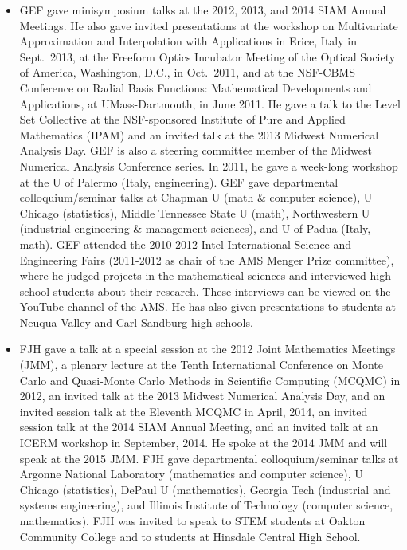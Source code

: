 \documentclass[11pt]{NSFamsart}
\begin{document}
\begin{itemize}[leftmargin=2.5ex]
\item GEF gave minisymposium talks at the 2012, 2013, and 2014 SIAM Annual Meetings.  He also gave invited presentations at the workshop on Multivariate Approximation and Interpolation with Applications in Erice, Italy in Sept.~2013, at the Freeform Optics Incubator Meeting of the Optical Society of America, Washington, D.C., in Oct.~2011, and at the NSF-CBMS Conference on Radial Basis Functions: Mathematical Developments and Applications, at UMass-Dartmouth, in June 2011. He gave a talk to the Level Set Collective at the NSF-sponsored Institute of Pure and Applied Mathematics (IPAM) and an invited talk at the 2013 Midwest Numerical Analysis Day. GEF is also a steering committee member of the Midwest Numerical Analysis Conference series. In 2011, he gave a week-long workshop at the U of Palermo (Italy, engineering). GEF gave departmental colloquium/seminar talks at Chapman U (math \& computer science), U Chicago (statistics), Middle Tennessee State U (math), Northwestern U (industrial engineering \& management sciences), and U of Padua (Italy, math).  GEF attended the 2010-2012 Intel International Science and Engineering Fairs (2011-2012 as chair of the AMS Menger Prize committee), where he judged projects in the mathematical sciences and interviewed high school students about their research. These interviews can be viewed on the YouTube channel of the AMS. He has also given presentations to students at Neuqua Valley and Carl Sandburg high schools.

\item FJH gave a talk at a special session at the 2012 Joint Mathematics Meetings (JMM), a plenary lecture at the Tenth International Conference on Monte Carlo and Quasi-Monte Carlo Methods in Scientific Computing (MCQMC) in 2012, an invited talk at the 2013 Midwest Numerical Analysis Day, and an invited session talk at the Eleventh MCQMC in April, 2014, an invited session talk at the 2014 SIAM Annual Meeting, and an invited talk at an ICERM workshop in September, 2014.  He spoke at the 2014 JMM and will speak at the 2015 JMM. FJH gave departmental colloquium/seminar talks at Argonne National Laboratory (mathematics and computer science), U Chicago (statistics), DePaul U (mathematics), Georgia Tech (industrial and systems engineering), and Illinois Institute of Technology (computer science, mathematics).  FJH was invited to speak to STEM students at Oakton Community College and to students at Hinsdale Central High School.

\end{itemize}
\end{document}
